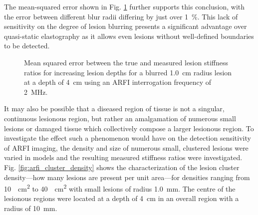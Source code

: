 			The mean-squared error shown in Fig. \ref{fig:arfi_blur_mse} further supports this conclusion, with the error between different blur radii differing by just over \SI{1}{\percent}. This lack of sensitivity on the degree of lesion blurring presents a significant advantage over quasi-static elastography as it allows even lesions without well-defined boundaries to be detected.

			\begin{figure}[!htb]
				\centering
				\caption[ARFI imaging-acquired lesion stiffness mean squared error related to lesion blurring]{Mean squared error between the true and measured lesion stiffness ratios for increasing lesion depths for a blurred \SI{1.0}{cm} radius lesion at a depth of \SI{4}{\cm} using an ARFI interrogation frequency of \SI{2}{\MHz}.}
				\label{fig:arfi_blur_mse}
			\end{figure}

			It may also be possible that a diseased region of tissue is not a singular, continuous lesionous region, but rather an amalgamation of numerous small lesions or damaged tissue which collectively compose a larger lesionous region. To investigate the effect such a phenomenon would have on the detection sensitivity of ARFI imaging, the density and size of numerous small, clustered lesions were varied in models and the resulting measured stiffness ratios were investigated. Fig. \ref{fig:arfi_cluster_density} shows the characterization of the lesion cluster density---how many lesions are present per unit area---for densities ranging from \SI{10}{\per\cm\squared} to \SI{40}{\per\cm\squared} with small lesions of radius \SI{1.0}{\mm}. The centre of the lesionous regions were located at a depth of \SI{4}{\cm} in an overall region with a radius of \SI{10}{\mm}.

